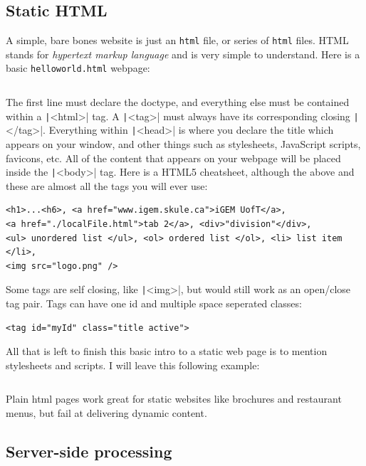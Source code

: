 \subsection{Static HTML}

A simple, bare bones website is just an \texttt{html} file, or series of
\texttt{html} files. HTML stands for \textit{hypertext markup language} and is 
very simple to understand. Here is a basic \texttt{helloworld.html} webpage:


\inputminted{html}{files/html/helloworld.html}

The first line must declare the doctype, and everything else must be contained
within a \texttt|<html>| tag. A \texttt|<tag>| must always
have its corresponding closing \texttt|</tag>|. Everything within 
\texttt|<head>| is where you declare the title which appears on your
window, and other things such as stylesheets, JavaScript scripts, favicons, etc.
All of the content that appears on your webpage will be placed inside the
\texttt|<body>| tag. Here is a HTML5 cheatsheet, although the above
and these are almost all the tags you will ever use:

\begin{verbatim}
<h1>...<h6>, <a href="www.igem.skule.ca">iGEM UofT</a>, 
<a href="./localFile.html">tab 2</a>, <div>"division"</div>, 
<ul> unordered list </ul>, <ol> ordered list </ol>, <li> list item </li>,
<img src="logo.png" />
\end{verbatim}

Some tags are self closing, like \texttt|<img>|, but would still work
as an open/close tag pair. Tags can have one id and multiple space seperated
classes:

\begin{verbatim}
<tag id="myId" class="title active">
\end{verbatim}

All that is left to finish this basic intro to a static web page is to mention
stylesheets and scripts. I will leave this following example:

\inputminted{html}{files/html/DNA.html}

Plain html pages work great for static websites like brochures and restaurant
menus, but fail at delivering dynamic content. 

\subsection{Server-side processing}

